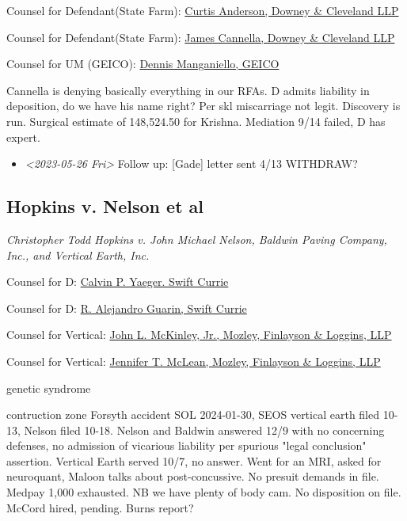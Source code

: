 \documentclass[11pt]{article}
\begin{document}
Counsel for Defendant(State Farm): \href{https://gabar.reliaguide.com/lawyer/30060-GA-William-Anderson-283202}{Curtis Anderson, Downey \& Cleveland LLP}

Counsel for Defendant(State Farm): \href{https://gabar.reliaguide.com/lawyer/30343-GA-James-Cannella-267443}{James Cannella, Downey \& Cleveland LLP}

Counsel for UM (GEICO): \href{https://gabar.reliaguide.com/lawyer/30305-GA-Dennis-Manganiello-258810}{Dennis Manganiello, GEICO}

Cannella is denying basically everything in our RFAs. D admits liability in deposition, do we have his name right? Per skl miscarriage not legit. Discovery is run. Surgical estimate of 148,524.50 for Krishna. Mediation 9/14 failed, D has expert.

\begin{itemize}
\item \textit{<2023-05-26 Fri> } Follow up: [Gade] letter sent 4/13 WITHDRAW?
\end{itemize}

\subsection*{Hopkins v. Nelson et al}
\label{sec:org4967c30}

\emph{Christopher Todd Hopkins v. John Michael Nelson, Baldwin Paving Company, Inc., and Vertical Earth, Inc.}

Counsel for D: \href{https://www.gabar.org/MemberSearchDetail.cfm?ID=Nzk3OTUy}{Calvin P. Yaeger. Swift Currie}

Counsel for D: \href{https://www.gabar.org/MemberSearchDetail.cfm?ID=OTM0MjEw}{R. Alejandro Guarin, Swift Currie}

Counsel for Vertical: \href{https://www.gabar.org/MemberSearchDetail.cfm?ID=NDk1NTEz}{John L. McKinley, Jr., Mozley, Finlayson \& Loggins, LLP}

Counsel for Vertical: \href{https://www.gabar.org/MemberSearchDetail.cfm?ID=NzAzOTkx}{Jennifer T. McLean, Mozley, Finlayson \& Loggins, LLP}

genetic syndrome

contruction zone Forsyth accident SOL 2024-01-30, SEOS vertical earth filed 10-13, Nelson filed 10-18. Nelson and Baldwin answered 12/9 with no concerning defenses, no admission of vicarious liability per spurious "legal conclusion" assertion. Vertical Earth served 10/7, no answer. Went for an MRI, asked for neuroquant, Maloon talks about post-concussive. No presuit demands in file. Medpay 1,000 exhausted. NB we have plenty of body cam. No disposition on file. McCord hired, pending. Burns report?
\end{document}
